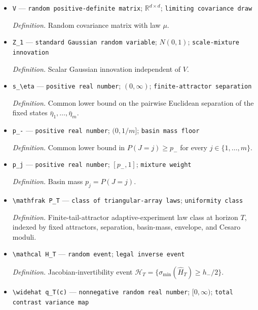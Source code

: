 \documentclass{article}
\begin{document}
\begin{itemize}
  \par\smallskip\noindent\emph{Definition.} A subsequential weak limit of the laws of \(V_\infty\), supported on the common compact covariance set.
  \item \texttt{V} --- \texttt{random positive-\allowbreak{}definite matrix}; \(\mathbb R^{d\times d}\); \texttt{limiting covariance draw}
  \par\smallskip\noindent\emph{Definition.} Random covariance matrix with law \(\mu\).
  \item \texttt{Z\_\allowbreak{}1} --- \texttt{standard Gaussian random variable}; \(N(0,1)\); \texttt{scale-\allowbreak{}mixture innovation}
  \par\smallskip\noindent\emph{Definition.} Scalar Gaussian innovation independent of \(V\).
  \item \texttt{s\_\allowbreak{}\textbackslash{}\allowbreak{}eta} --- \texttt{positive real number}; \((0,\infty)\); \texttt{finite-\allowbreak{}attractor separation}
  \par\smallskip\noindent\emph{Definition.} Common lower bound on the pairwise Euclidean separation of the fixed states \(\bar\eta_1,\ldots,\bar\eta_m\).
  \item \texttt{p\_\allowbreak{}-\allowbreak{}} --- \texttt{positive real number}; \((0,1/m]\); \texttt{basin mass floor}
  \par\smallskip\noindent\emph{Definition.} Common lower bound in \(P(J=j)\ge p_-\) for every \(j\in\{1,\ldots,m\}\).
  \item \texttt{p\_\allowbreak{}j} --- \texttt{positive real number}; \([p_-,1]\); \texttt{mixture weight}
  \par\smallskip\noindent\emph{Definition.} Basin mass \(p_j=P(J=j)\).
  \item \texttt{\textbackslash{}\allowbreak{}mathfrak P\_\allowbreak{}T} --- \texttt{class of triangular-\allowbreak{}array laws}; \texttt{uniformity class}
  \par\smallskip\noindent\emph{Definition.} Finite-tail-attractor adaptive-experiment law class at horizon \(T\), indexed by fixed attractors, separation, basin-mass, envelope, and Cesaro moduli.
  \item \texttt{\textbackslash{}\allowbreak{}mathcal H\_\allowbreak{}T} --- \texttt{random event}; \texttt{legal inverse event}
  \par\smallskip\noindent\emph{Definition.} Jacobian-invertibility event \(\mathcal H_T=\{\sigma_{\min}(\widehat H_T)\ge h_-/2\}\).
  \item \texttt{\textbackslash{}\allowbreak{}widehat q\_\allowbreak{}T(c)} --- \texttt{nonnegative random real number}; \([0,\infty)\); \texttt{total contrast variance map}

\end{itemize}
\end{document}
